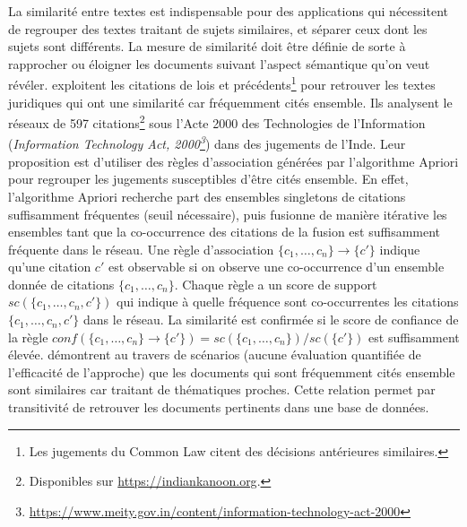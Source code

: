 La similarité entre textes est indispensable pour des applications qui nécessitent de regrouper des textes traitant de sujets similaires, et séparer ceux dont les sujets sont différents. La  mesure de similarité doit être définie de sorte à rapprocher ou éloigner les documents suivant l'aspect sémantique qu'on veut révéler. \citet{nair2018judgsimassorule} exploitent les citations de lois et précédents\footnote{Les jugements du \og Common Law \fg{} citent des décisions antérieures similaires.} pour retrouver les textes juridiques qui ont une similarité car fréquemment cités ensemble. Ils analysent le réseaux de 597 citations\footnote{Disponibles sur \url{https://indiankanoon.org}.} sous l'Acte 2000 des Technologies de l'Information (\textit{Information Technology Act, 2000\footnote{\url{https://www.meity.gov.in/content/information-technology-act-2000}}}) dans des jugements de l'Inde. Leur proposition est d'utiliser des règles d'association générées par l'algorithme Apriori \citep{agrawal1994algoApriori} pour regrouper les jugements susceptibles d'être cités ensemble. En effet, l'algorithme Apriori recherche part des ensembles singletons de citations suffisamment fréquentes (seuil nécessaire), puis fusionne de manière itérative les ensembles tant que la co-occurrence des citations de la fusion est suffisamment fréquente dans le réseau. Une règle d'association $\lbrace c_1,\dots,c_n \rbrace \rightarrow \lbrace c' \rbrace$ indique qu'une citation $c'$ est observable si on observe une co-occurrence d'un ensemble donnée de citations $\lbrace c_1,\dots,c_n \rbrace$. Chaque règle a un score de support $sc(\lbrace c_1,\dots,c_n, c' \rbrace)$ qui indique à quelle fréquence sont co-occurrentes les citations $\lbrace c_1,\dots,c_n, c' \rbrace$ dans le réseau. La similarité est confirmée si le score de confiance de la règle  $conf(\lbrace c_1,\dots,c_n \rbrace \rightarrow \lbrace c' \rbrace) = sc(\lbrace c_1,\dots,c_n \rbrace) / sc(\lbrace c' \rbrace)$ est suffisamment élevée.
\citet{nair2018judgsimassorule} démontrent au travers de scénarios (aucune évaluation quantifiée de l'efficacité de l'approche) que les documents qui sont fréquemment cités ensemble sont similaires car traitant de thématiques proches. Cette relation permet par transitivité de retrouver les documents pertinents dans une base de données. 

